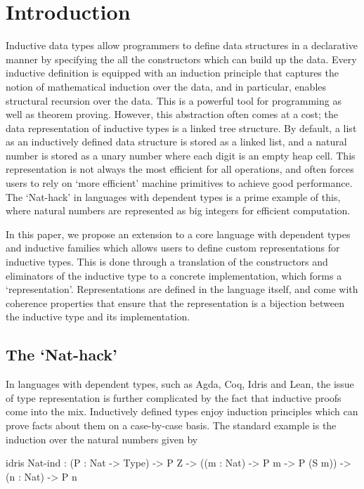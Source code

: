 \section{Introduction}\label{sec:intro}

Inductive data types allow programmers to define data structures in a
declarative manner by specifying the all the constructors which can build up the
data. Every inductive definition is equipped with an induction principle that
captures the notion of mathematical induction over the data, and in particular,
enables structural recursion over the data. This is a powerful tool for
programming as well as theorem proving. However, this abstraction often comes at
a cost; the data representation of inductive types is a linked tree structure.
By default, a list as an inductively defined data structure is stored as a
linked list, and a natural number is stored as a unary number where each digit
is an empty heap cell. This representation is not always the most efficient for
all operations, and often forces users to rely on `more efficient' machine
primitives to achieve good performance. The `Nat-hack' in languages with
dependent types is a prime example of this, where natural numbers are
represented as big integers for efficient computation.

In this paper, we propose an extension to a core language with dependent types
and inductive families which allows users to define custom representations for
inductive types. This is done through a translation of the constructors and
eliminators of the inductive type to a concrete implementation, which forms a
`representation'. Representations are defined in the language itself, and come
with coherence properties that ensure that the representation is a bijection
between the inductive type and its implementation.


\subsection{The `Nat-hack'}

In languages with dependent types, such as Agda, Coq, Idris and Lean, the issue
of type representation is further complicated by the fact that inductive proofs
come into the mix. Inductively defined types enjoy induction principles which
can prove facts about them on a case-by-case basis. The standard example is the
induction over the natural numbers  given by
\begin{bminted}{idris}
  Nat-ind : (P : Nat -> Type) -> P Z -> ((m : Nat) -> P m -> P (S m)) -> (n : Nat) -> P n
\end{bminted}

